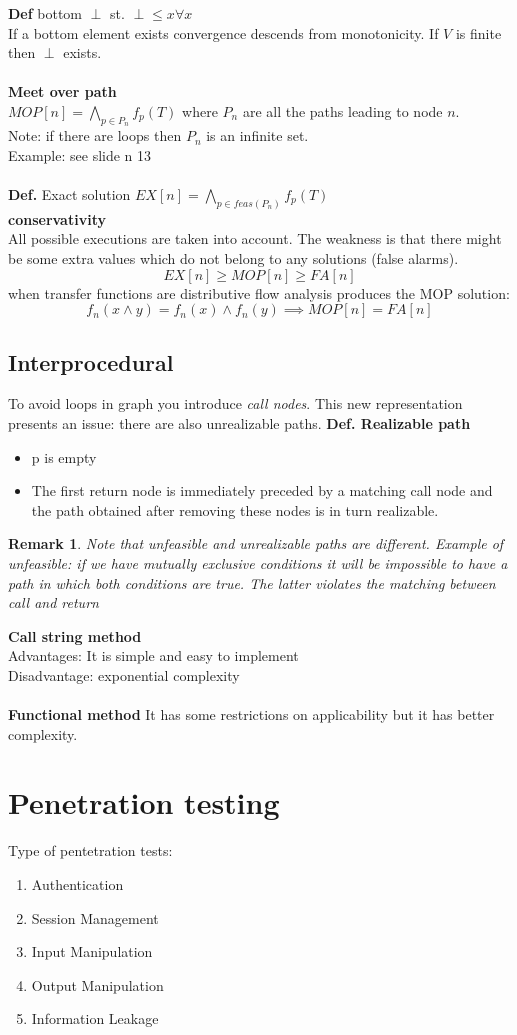 \documentclass[10pt,a4paper]{book}
\newtheorem{remark}{Remark}
\begin{document}
\textbf{Def} bottom $\perp$ st. $\perp \leq x \forall x$\\
If a bottom element exists convergence descends from monotonicity. If $V$ is finite then $\perp$ exists.\\\\
\textbf{Meet over path}\\
$MOP[n] = \bigwedge_{p\in P_n}f_p(T)$ where $P_n$ are all the paths leading to node $n$.\\Note: if there are loops then $P_n$ is an infinite set.\\
Example: see slide n 13\\\\
\textbf{Def.} Exact solution $EX[n] = \bigwedge_{p \in feas(P_n)}f_p(T)$\\
\textbf{conservativity}\\
All possible executions are taken into account. The weakness is that there might be some extra values which do not belong to any solutions (false alarms). 
$$ EX[n] \geq MOP[n] \geq FA[n]$$
when transfer functions are distributive  flow analysis produces the MOP solution:
$$ f_n(x \wedge y) = f_n(x) \wedge f_n(y) \implies MOP[n] = FA[n] $$
\section{Interprocedural}
To avoid loops in graph you introduce \emph{call nodes}.
This new representation presents an issue: there are also unrealizable paths.
\textbf{Def. Realizable path}
\begin{itemize}
\item p is empty
\item The first return node is immediately preceded by a matching call node and the path obtained after removing these nodes is in turn realizable.
\end{itemize}
\begin{remark}
Note that unfeasible and unrealizable paths are different.
Example of unfeasible: if we have mutually exclusive conditions it will be impossible to have a path in which both conditions are true.
The latter violates the matching between call and return
\end{remark}
\textbf{Call string method}\\
Advantages: It is simple and easy to implement\\
Disadvantage: exponential complexity\\\\
\textbf{Functional method}
It has some restrictions on applicability but it has better complexity.
\chapter{Penetration testing}
Type of pentetration tests:
\begin{enumerate}
\item Authentication
\item Session Management
\item Input Manipulation
\item Output Manipulation
\item Information Leakage
\end{enumerate}
\end{document}
